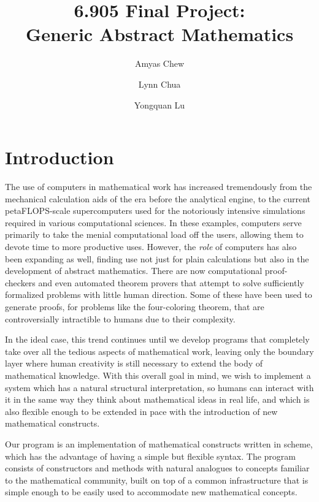 \documentclass{article}
\begin{document}
    
    \title{6.905 Final Project:\\Generic Abstract Mathematics}
    \author{Amyas Chew \and Lynn Chua \and Yongquan Lu}
    \maketitle
    
    
    \section{Introduction}
        
        The use of computers in mathematical work has increased tremendously from the mechanical calculation aids of the era before the analytical engine, to the current petaFLOPS-scale supercomputers used for the notoriously intensive simulations required in various computational sciences. In these examples, computers serve primarily to take the menial computational load off the users, allowing them to devote time to more productive uses. However, the \emph{role} of computers has also been expanding as well, finding use not just for plain calculations but also in the development of abstract mathematics. There are now computational proof-checkers and even automated theorem provers that attempt to solve sufficiently formalized problems with little human direction. Some of these have been used to generate proofs, for problems like the four-coloring theorem, that are controversially intractible to humans due to their complexity.
        
        In the ideal case, this trend continues until we develop programs that completely take over all the tedious aspects of mathematical work, leaving only the boundary layer where human creativity is still necessary to extend the body of mathematical knowledge. With this overall goal in mind, we wish to implement a system which has a natural structural interpretation, so humans can interact with it in the same way they think about mathematical ideas in real life, and which is also flexible enough to be extended in pace with the introduction of new mathematical constructs.
        
        Our program is an implementation of mathematical constructs written in scheme, which has the advantage of having a simple but flexible syntax. The program consists of constructors and methods with natural analogues to concepts familiar to the mathematical community, built on top of a common infrastructure that is simple enough to be easily used to accommodate new mathematical concepts.
        
\end{document}
